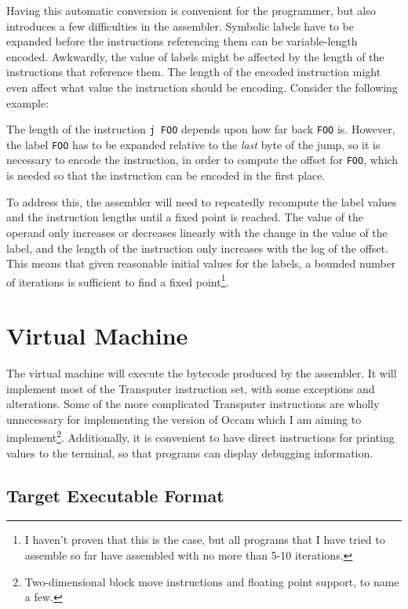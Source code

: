 Having this automatic conversion is convenient for the programmer, but also
introduces a few difficulties in the assembler. Symbolic labels have to be
expanded before the instructions referencing them can be variable-length
encoded. Awkwardly, the value of labels might be affected by the length of
the instructions that reference them. The length of the encoded instruction
might even affect what value the instruction should be encoding.
Consider the following example:


The length of the instruction \texttt{j FOO} depends upon how far back
\texttt{FOO} is. However, the label \texttt{FOO} has to be expanded relative to
the \textit{last} byte of the jump, so it is necessary to encode the
instruction, in order to compute the offset for \texttt{FOO}, which is needed so
that the instruction can be encoded in the first place.

To address this, the assembler will need to repeatedly recompute the label
values and the instruction lengths until a fixed point is reached. The value of
the operand only increases or decreases linearly with the change in the value of
the label, and the length of the instruction only increases with the log of the
offset. This means that given reasonable initial values for the labels, a
bounded number of iterations is sufficient to find a fixed point\footnote{I
haven't proven that this is the case, but all programs that I have tried to
assemble so far have assembled with no more than 5-10 iterations.}.

\section{Virtual Machine}

The virtual machine will execute the bytecode produced by the assembler. It will
implement most of the Transputer instruction set, with some exceptions and
alterations. Some of the more complicated Transputer instructions are wholly
unnecessary for implementing the version of Occam which I am aiming to
implement\footnote{Two-dimensional block move instructions and floating point
support, to name a few.}. Additionally, it is convenient to have direct
instructions for printing values to the terminal, so that programs can display
debugging information.

\subsection{Target Executable Format} \label{binary-format}

